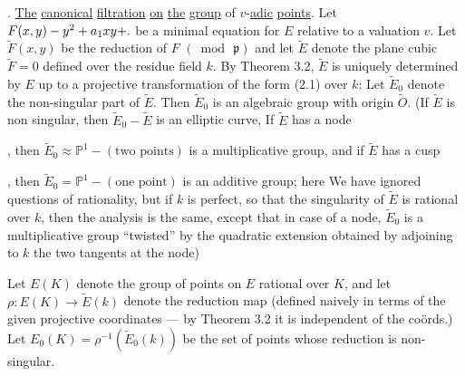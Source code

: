 
\begingroup
\makeatletter\tagsleft@true{}. \uline{The} \uline{canonical} \uline{filtration} \uline{on} \uline{the} \uline{group} of $v$-\uline{adic} \uline{points}. Let $F(x,y)-y^2+a_1xy+\ldotp$ be a minimal equation for $E$ relative to a valuation $v$. Let $\widetilde F(x,y)$ be the reduction of $F$ $(\bmod\,\mathfrak{p})$ and let $\widetilde E$ denote the plane cubic $\widetilde F=0$ defined over the residue field $k$. By Theorem 3.2, $\widetilde E$ is uniquely determined by $E$ up to a projective transformation of the form (2.1) over $k$: Let $\widetilde E_0$ denote the non-singular part of $\widetilde E$. Then $\widetilde E_0$ is an algebraic group with origin $\widetilde O$. (If $\widetilde E$ is non singular, then $\widetilde E_0-\widetilde E$ is an elliptic curve, If $\widetilde E$ has a node
\parbox[c]{1.4em}{\setlength{\topsep}{0pt}}, then $\widetilde E_0\approx\mathbb{P}^1-(\text{two points})$ is a multiplicative group, and if $\widetilde E$ has a cusp
\parbox[c]{1.4em}{\setlength{\topsep}{0pt}}, then $\widetilde E_0=\mathbb{P}^1-(\text{one point})$ is an additive group; here We have ignored questions of rationality, but if $k$ is perfect, so that the singularity of $\widetilde E$ is rational over $k$, then the analysis is the same, except that in case of a node, $\widetilde E_0$ is a multiplicative group ``twisted'' by the quadratic extension obtained by adjoining to $k$ the two tangents at the node)

Let $E(K)$ denote the group of points on $E$ rational over $K$, and let $\rho:E(K)\longrightarrow\widetilde E(k)$ denote the reduction map (defined naively in terms of the given projective coordinates --- by Theorem 3.2 it is independent of the coörds.) Let $E_0(K)=\rho^{-1}(\widetilde E_0(k))$ be the set of points whose reduction is non-singular.


